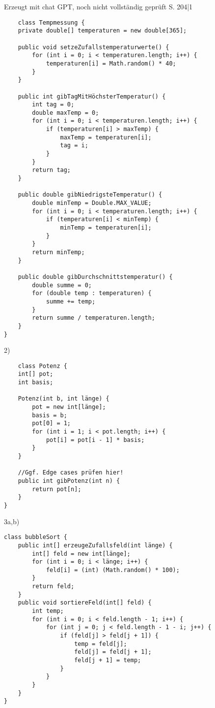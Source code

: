 \documentclass[fontsize=12pt]{article}
\begin{document}
Erzeugt mit chat GPT, noch nicht vollständig geprüft
S. 204|1
\begin{verbatim}
    class Tempmessung {
    private double[] temperaturen = new double[365];

    public void setzeZufallstemperaturwerte() {
        for (int i = 0; i < temperaturen.length; i++) {
            temperaturen[i] = Math.random() * 40;
        }
    }

    public int gibTagMitHöchsterTemperatur() {
        int tag = 0;
        double maxTemp = 0;
        for (int i = 0; i < temperaturen.length; i++) {
            if (temperaturen[i] > maxTemp) {
                maxTemp = temperaturen[i];
                tag = i;
            }
        }
        return tag;
    }

    public double gibNiedrigsteTemperatur() {
        double minTemp = Double.MAX_VALUE;
        for (int i = 0; i < temperaturen.length; i++) {
            if (temperaturen[i] < minTemp) {
                minTemp = temperaturen[i];
            }
        }
        return minTemp;
    }

    public double gibDurchschnittstemperatur() {
        double summe = 0;
        for (double temp : temperaturen) {
            summe += temp;
        }
        return summe / temperaturen.length;
    }
}
\end{verbatim}
2)
\begin{verbatim}
    class Potenz {
    int[] pot;
    int basis;

    Potenz(int b, int länge) {
        pot = new int[länge];
        basis = b;
        pot[0] = 1;
        for (int i = 1; i < pot.length; i++) {
            pot[i] = pot[i - 1] * basis;
        }
    }

    //Ggf. Edge cases prüfen hier!
    public int gibPotenz(int n) {
        return pot[n];
    }
}

\end{verbatim}

3a,b)
\begin{verbatim}
class bubbleSort {
    public int[] erzeugeZufallsfeld(int länge) {
        int[] feld = new int[länge];
        for (int i = 0; i < länge; i++) {
            feld[i] = (int) (Math.random() * 100);
        }
        return feld;
    }
    public void sortiereFeld(int[] feld) {
        int temp;
        for (int i = 0; i < feld.length - 1; i++) {
            for (int j = 0; j < feld.length - 1 - i; j++) {
                if (feld[j] > feld[j + 1]) {
                    temp = feld[j];
                    feld[j] = feld[j + 1];
                    feld[j + 1] = temp;
                }
            }
        }
    }
}
\end{verbatim}
\end{document}
